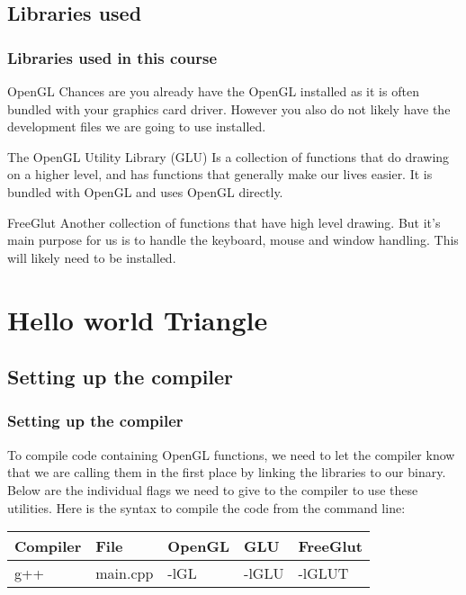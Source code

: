 \documentclass{beamer}
\begin{document}

\subsection{Libraries used}

\begin{frame}
\frametitle{Libraries used in this course}
\begin{block}{OpenGL}
Chances are you already have the OpenGL installed as it is often bundled with your graphics card driver. However you also do not likely have the development files we are going to use installed.
\end{block}

\begin{block}{The OpenGL Utility Library (GLU)}
Is a collection of functions that do drawing on a higher level, and has functions that generally make our lives easier. It is bundled with OpenGL and uses OpenGL directly.
\end{block}

\begin{block}{FreeGlut}
Another collection of functions that have high level drawing. But it's main purpose for us is to handle the keyboard, mouse and window handling. This will likely need to be installed.
\end{block}
\end{frame}

\section{Hello world Triangle}
\subsection{Setting up the compiler}

\begin{frame}
\frametitle{Setting up the compiler}
To compile code containing OpenGL functions, we need to let the compiler know that we are calling them in the first place by linking the libraries to our binary. Below are the individual flags we need to give to the compiler to use these utilities. Here is the syntax to compile the code from the command line:
\begin{table}
\begin{tabular}{l l l l l}
  \toprule
  \textbf{Compiler} & \textbf{File} & \textbf{OpenGL} & \textbf{GLU} & \textbf{FreeGlut}\\
  \midrule
  g++ & main.cpp & -lGL & -lGLU & -lGLUT \\
  \bottomrule
\end{tabular}
\end{table}
\end{frame}
\end{document}
